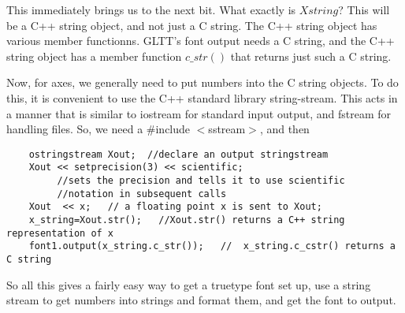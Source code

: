 \documentclass[12pt]{article}
\begin{document}
This immediately brings us to the next bit. What exactly is $Xstring$?
This will be a C++ string object, and not just a  C string. The
C++ string object has various member functionns. GLTT's font
output needs a C string, and the C++ string object has a member function
$c\_str()$ that returns just such a C string.

Now, for axes, we generally need to put numbers into the C string objects.
To do this, it is convenient to use the C++ standard library string-stream.
This acts in a manner that is similar to iostream for standard input output,
 and fstream for handling files. So, we need a \#include $<$sstream$>$,
and then
\begin{verbatim}
    ostringstream Xout;  //declare an output stringstream
    Xout << setprecision(3) << scientific;
         //sets the precision and tells it to use scientific
         //notation in subsequent calls
    Xout  << x;   // a floating point x is sent to Xout;
    x_string=Xout.str();   //Xout.str() returns a C++ string representation of x
    font1.output(x_string.c_str());   //  x_string.c_cstr() returns a C string
\end{verbatim}
So all this gives a fairly easy way to get a truetype font set up,
 use a string stream to get numbers into strings and format them,
 and get the font to output. 
\end{document}

